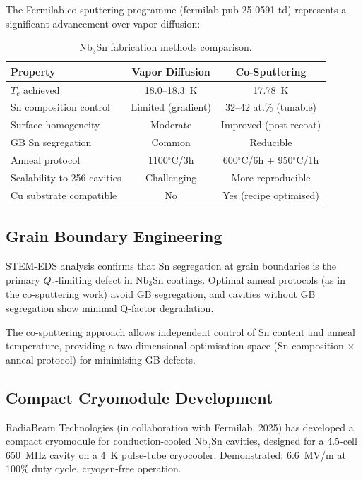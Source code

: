\documentclass[11pt]{article}
\theoremstyle{definition}
\theoremstyle{remark}
\begin{document}
The Fermilab co-sputtering programme (fermilab-pub-25-0591-td)
represents a significant advancement over vapor diffusion:

\begin{table}[H]
\centering
\caption{Nb$_3$Sn fabrication methods comparison.}
\renewcommand{\arraystretch}{1.3}
\begin{tabular}{p{3cm}cc}
\toprule
\textbf{Property} & \textbf{Vapor Diffusion} & \textbf{Co-Sputtering} \\
\midrule
$T_c$ achieved & 18.0--18.3~K & 17.78~K \\
Sn composition control & Limited (gradient) & 32--42 at.\% (tunable) \\
Surface homogeneity & Moderate & Improved (post recoat) \\
GB Sn segregation & Common & Reducible \\
Anneal protocol & 1100$^\circ$C/3h & 600$^\circ$C/6h + 950$^\circ$C/1h \\
Scalability to 256 cavities & Challenging & More reproducible \\
Cu substrate compatible & No & Yes (recipe optimised) \\
\bottomrule
\end{tabular}
\end{table}

\subsection{Grain Boundary Engineering}

STEM-EDS analysis confirms that Sn segregation at grain boundaries
is the primary $Q_0$-limiting defect in Nb$_3$Sn coatings. Optimal
anneal protocols (as in the co-sputtering work) avoid GB segregation,
and cavities without GB segregation show minimal Q-factor degradation.

The co-sputtering approach allows independent control of Sn content
and anneal temperature, providing a two-dimensional optimisation space
(Sn composition $\times$ anneal protocol) for minimising GB defects.

\subsection{Compact Cryomodule Development}

RadiaBeam Technologies (in collaboration with Fermilab, 2025) has
developed a compact cryomodule for conduction-cooled Nb$_3$Sn cavities,
designed for a 4.5-cell 650~MHz cavity on a 4~K pulse-tube cryocooler.
Demonstrated: 6.6~MV/m at 100\% duty cycle, cryogen-free operation.
\end{document}
